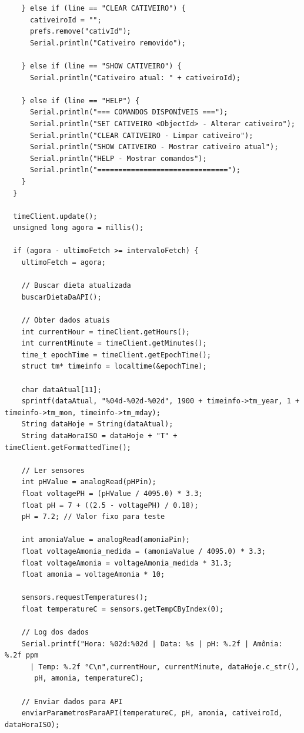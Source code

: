 \documentclass[
  a4paper,
  12pt,
  english,
  brazilian,
]{article}
\begin{document}
\begin{verbatim}
    } else if (line == "CLEAR CATIVEIRO") {
      cativeiroId = "";
      prefs.remove("cativId");
      Serial.println("Cativeiro removido");

    } else if (line == "SHOW CATIVEIRO") {
      Serial.println("Cativeiro atual: " + cativeiroId);

    } else if (line == "HELP") {
      Serial.println("=== COMANDOS DISPONÍVEIS ===");
      Serial.println("SET CATIVEIRO <ObjectId> - Alterar cativeiro");
      Serial.println("CLEAR CATIVEIRO - Limpar cativeiro");
      Serial.println("SHOW CATIVEIRO - Mostrar cativeiro atual");
      Serial.println("HELP - Mostrar comandos");
      Serial.println("===============================");
    }
  }

  timeClient.update();
  unsigned long agora = millis();

  if (agora - ultimoFetch >= intervaloFetch) {
    ultimoFetch = agora;
   
    // Buscar dieta atualizada
    buscarDietaDaAPI();
   
    // Obter dados atuais
    int currentHour = timeClient.getHours();
    int currentMinute = timeClient.getMinutes();
    time_t epochTime = timeClient.getEpochTime();
    struct tm* timeinfo = localtime(&epochTime);
   
    char dataAtual[11];
    sprintf(dataAtual, "%04d-%02d-%02d", 1900 + timeinfo->tm_year, 1 + timeinfo->tm_mon, timeinfo->tm_mday);
    String dataHoje = String(dataAtual);
    String dataHoraISO = dataHoje + "T" + timeClient.getFormattedTime();
   
    // Ler sensores
    int pHValue = analogRead(pHPin);
    float voltagePH = (pHValue / 4095.0) * 3.3;
    float pH = 7 + ((2.5 - voltagePH) / 0.18);
    pH = 7.2; // Valor fixo para teste
   
    int amoniaValue = analogRead(amoniaPin);
    float voltageAmonia_medida = (amoniaValue / 4095.0) * 3.3;
    float voltageAmonia = voltageAmonia_medida * 31.3;
    float amonia = voltageAmonia * 10;
   
    sensors.requestTemperatures();
    float temperatureC = sensors.getTempCByIndex(0);
   
    // Log dos dados
    Serial.printf("Hora: %02d:%02d | Data: %s | pH: %.2f | Amônia: %.2f ppm 
      | Temp: %.2f °C\n",currentHour, currentMinute, dataHoje.c_str(),
       pH, amonia, temperatureC);
   
    // Enviar dados para API
    enviarParametrosParaAPI(temperatureC, pH, amonia, cativeiroId, dataHoraISO);
   

\end{verbatim}
\end{document}
